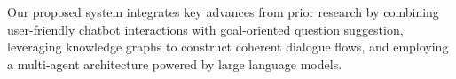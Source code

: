 
Our proposed system integrates key advances from prior research by combining user-friendly chatbot interactions with goal-oriented question suggestion, leveraging knowledge graphs to construct coherent dialogue flows, and employing a multi-agent architecture powered by large language models.



